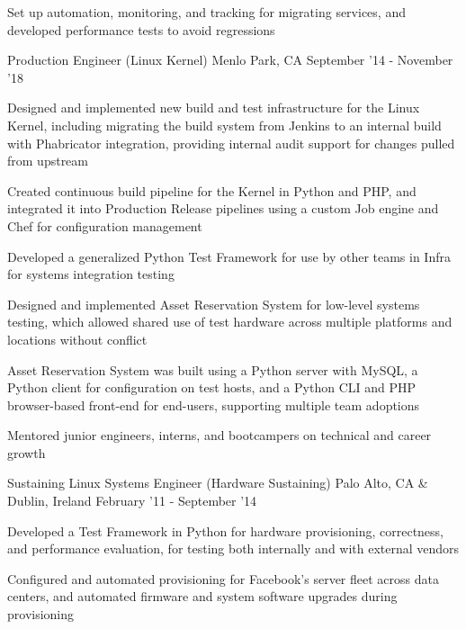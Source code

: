 \begin{cventries}
{\begin{cvitems}
		  \item Set up automation, monitoring, and tracking for migrating services, and developed performance tests to avoid regressions
        \end{cvitems}
    }
\vspace{0mm}
\cventry
	{Production Engineer \color{solarized-orange}(Linux Kernel)} %
    {} %
    {Menlo Park, CA} %
    {September '14 - November '18} %
    {
        \begin{cvitems}
		  \item Designed and implemented new build and test infrastructure for the Linux Kernel, including migrating the build system from Jenkins to an internal build with Phabricator integration, providing internal audit support for changes pulled from upstream
		  \item Created continuous build pipeline for the Kernel in Python and PHP, and integrated it into Production Release pipelines using a custom Job engine and Chef for configuration management
		  \item Developed a generalized Python Test Framework for use by other teams in Infra for systems integration testing
		  \item Designed and implemented Asset Reservation System for low-level systems testing, which allowed shared use of test hardware across multiple platforms and locations without conflict
		  \item Asset Reservation System was built using a Python server with MySQL, a Python client for configuration on test hosts, and a Python CLI and PHP browser-based front-end for end-users, supporting multiple team adoptions
          \item Mentored junior engineers, interns, and bootcampers on technical and career growth
        \end{cvitems}
    }
\vspace{0mm}
\cventry
	{Sustaining Linux Systems Engineer \color{solarized-orange}(Hardware Sustaining)} %
    {} %
	{Palo Alto, CA \& Dublin, Ireland} %
    {February '11 - September '14} %
    {
        \begin{cvitems}
		  \item Developed a Test Framework in Python for hardware provisioning, correctness, and performance evaluation, for testing both internally and with external vendors
		  \item Configured and automated provisioning for Facebook's server fleet across data centers, and automated firmware and system software upgrades during provisioning

\end{cvitems}}
\end{cventries}
